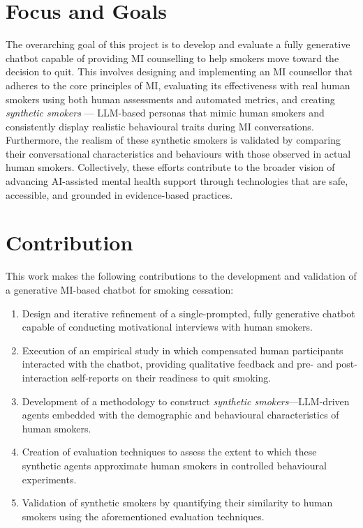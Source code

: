 \section{Focus and Goals}
The overarching goal of this project is to develop and evaluate a fully generative chatbot capable of providing MI counselling to help smokers move toward the decision to quit. This involves designing and implementing an MI counsellor that adheres to the core principles of MI, evaluating its effectiveness with real human smokers using both human assessments and automated metrics, and creating \emph{synthetic smokers} --- LLM-based personas that mimic human smokers and consistently display realistic behavioural traits during MI conversations. Furthermore, the realism of these synthetic smokers is validated by comparing their conversational characteristics and behaviours with those observed in actual human smokers. Collectively, these efforts contribute to the broader vision of advancing AI-assisted mental health support through technologies that are safe, accessible, and grounded in evidence-based practices.

\section{Contribution}

This work makes the following contributions to the development and validation of a generative MI-based chatbot for smoking cessation:

\begin{enumerate}
    \item Design and iterative refinement of a single-prompted, fully generative chatbot capable of conducting motivational interviews with human smokers.
    
    \item Execution of an empirical study in which compensated human participants interacted with the chatbot, providing qualitative feedback and pre- and post-interaction self-reports on their readiness to quit smoking. 
    
    \item Development of a methodology to construct \emph{synthetic smokers}—LLM-driven agents embedded with the demographic and behavioural characteristics of human smokers.
    
    \item Creation of evaluation techniques to assess the extent to which these synthetic agents approximate human smokers in controlled behavioural experiments.
    
    \item Validation of synthetic smokers by quantifying their similarity to human smokers using the aforementioned evaluation techniques. 
    
\end{enumerate}

